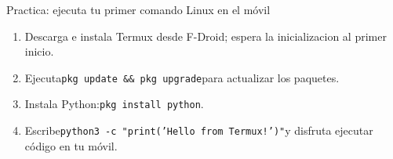 \begin{tcbpractice}{Practica: ejecuta tu primer comando Linux en el móvil}
\begin{enumerate}
  \item Descarga e instala Termux desde F-Droid; espera la inicializacion al primer inicio.
  \item Ejecuta\texttt{pkg update \&\& pkg upgrade}para actualizar los paquetes.
  \item Instala Python:\texttt{pkg install python}.
  \item Escribe\texttt{python3 -\allowbreak c "print('Hello from Termux!')"}y disfruta ejecutar código en tu móvil.
\end{enumerate}

\end{tcbpractice}
